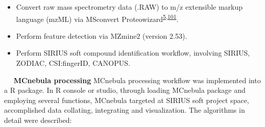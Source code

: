\begin{itemize}
\tightlist
\item
  Convert raw mass spectrometry data (.RAW) to m/z extensible markup
  language (mzML) via MSconvert
  Proteowizard\textsuperscript{\protect\hyperlink{ref-2012d}{5},\protect\hyperlink{ref-2011b}{101}}.
\item
  Perform feature detection via MZmine2 (version 2.53).
\item
  Perform SIRIUS soft compound identification workflow, involving
  SIRIUS, ZODIAC, CSI:fingerID, CANOPUS.
\end{itemize}

   \textbf{MCnebula processing} MCnebula processing workflow was
implemented into a R package. In R console or studio, through loading
MCnebula package and employing several functions, MCnebula targeted at
SIRIUS soft project space, accomplished data collating, integrating and
visualization. The algorithms in detail were described:


